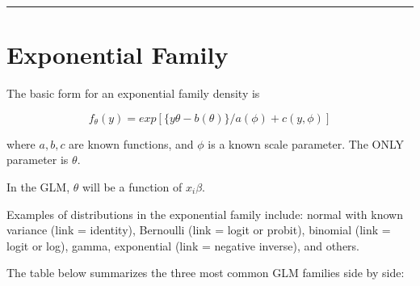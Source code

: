 \documentclass[
  letterpaper,
  DIV=11,
  numbers=noendperiod]{scrreprt}
\begin{document}
\begin{center}\rule{0.5\linewidth}{0.5pt}\end{center}

\hypertarget{exponential-family}{%
\section*{Exponential Family}\label{exponential-family}}


\begin{tcolorbox}[enhanced jigsaw, rightrule=.15mm, breakable, left=2mm, colframe=quarto-callout-note-color-frame, opacityback=0, leftrule=.75mm, toprule=.15mm, colback=white, arc=.35mm, bottomrule=.15mm]

The basic form for an exponential family density is

\[
f_{\theta} (y) = exp[\{y\theta - b(\theta)\} / a(\phi) + c(y, \phi )]
\]

where \(a, b, c\) are known functions, and \(\phi\) is a known scale
parameter. The ONLY parameter is \(\theta\).

\end{tcolorbox}

In the GLM, \(\theta\) will be a function of \(x_i\beta\).

Examples of distributions in the exponential family include: normal with
known variance (link = identity), Bernoulli (link = logit or probit),
binomial (link = logit or log), gamma, exponential (link = negative
inverse), and others.

The table below summarizes the three most common GLM families side by
side:
\end{document}
